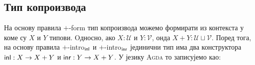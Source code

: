 \subsection{Тип копроизвода}

На основу правила $+$-form тип копроизвода можемо формирати из контекста у коме су $X$ и $Y$ типови. Oдносно, ако $X : \mathcal{U}$ и $Y : \mathcal{V}$, онда $X + Y : \mathcal{U} \sqcup \mathcal{V}$. Поред тога, на основу правила $+$-intro$_{\mathsf{inl}}$ и $+$-intro$_{\mathsf{inr}}$ јединични тип има два конструктора $\mathsf{inl} : X \to X + Y$ и $\mathsf{inr} : Y \to X + Y$. У језику \textsc{Agda} то записујемо као:
\begin{code}%
\>[0]\AgdaSpace{}%
\AgdaOperator{\AgdaDatatype{\AgdaUnderscore{}+\AgdaUnderscore{}}}\AgdaSpace{}%
\AgdaSymbol{(}\AgdaSpace{}%
\AgdaSymbol{:}\AgdaSpace{}%
\AgdaSpace{}%
\AgdaSpace{}%
\AgdaSymbol{)}\AgdaSpace{}%
\AgdaSymbol{(}\AgdaSpace{}%
\AgdaSymbol{:}\AgdaSpace{}%
\AgdaSpace{}%
\AgdaSpace{}%
\AgdaSymbol{)}\AgdaSpace{}%
\AgdaSymbol{:}\AgdaSpace{}%
\AgdaSpace{}%
\AgdaSpace{}%
\AgdaSpace{}%
\AgdaSpace{}%
\<%
\\
\>[0][@{}l@{\AgdaIndent{0}}]%
\>[4]\AgdaSpace{}%
\AgdaSymbol{:}\AgdaSpace{}%
\AgdaSpace{}%
\AgdaSpace{}%
\AgdaSpace{}%
\AgdaOperator{\AgdaDatatype{+}}\AgdaSpace{}%
\<%
\\
%
\>[4]\AgdaSpace{}%
\AgdaSymbol{:}\AgdaSpace{}%
\AgdaSpace{}%
\AgdaSpace{}%
\AgdaSpace{}%
\AgdaOperator{\AgdaDatatype{+}}\AgdaSpace{}%
\<%
\end{code}


